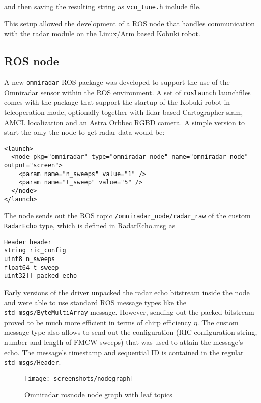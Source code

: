 and then saving the resulting string as \texttt{vco\_tune.h} include
file.

This setup allowed the development of a ROS node that handles
communication with the radar module on the Linux/Arm based Kobuki robot.

\subsection{ROS node}\label{ros-node}

A new \texttt{omniradar} ROS package was developed to support the use of
the Omniradar sensor within the ROS environment. A set of
\texttt{roslaunch} launchfiles comes with the package that support the
startup of the Kobuki robot in teleoperation mode, optionally together
with lidar-based Cartographer slam, AMCL localization and an Astra
Orbbec RGBD camera. A simple version to start the only the node to get
radar data would be:

\begin{verbatim}
<launch>
  <node pkg="omniradar" type="omniradar_node" name="omniradar_node" output="screen">
    <param name="n_sweeps" value="1" />
    <param name="t_sweep" value="5" />
  </node>
</launch>
\end{verbatim}

The node sends out the ROS topic \texttt{/omniradar\_node/radar\_raw} of
the custom \texttt{RadarEcho} type, which is defined in RadarEcho.msg as

\begin{verbatim}
Header header
string ric_config
uint8 n_sweeps
float64 t_sweep
uint32[] packed_echo
\end{verbatim}

Early versions of the driver unpacked the radar echo bitstream inside
the node and were able to use standard ROS message types like the
\texttt{std\_msgs/ByteMultiArray} message. However, sending out the
packed bitstream proved to be much more efficient in terms of chirp
efficiency \(\eta\). The custom message type also allows to send out the
configuration (RIC configuration string, number and length of FMCW
sweeps) that was used to attain the message's echo. The message's
timestamp and sequential ID is contained in the regular
\texttt{std\_msgs/Header}.

\begin{figure}[htbp]
    \centering
    \label{fig:nodegraph}
    \texttt{[image: screenshots/nodegraph]}
    \caption{Omniradar rosnode node graph with leaf topics}
\end{figure}

